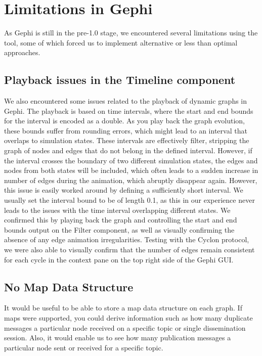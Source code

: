 \section{Limitations in Gephi}

As Gephi is still in the pre-1.0 stage, we encountered several
limitations using the tool, some of which forced us to implement
alternative or less than optimal approaches.

\subsection{Playback issues in the Timeline component}

We also encountered some issues related to the playback of dynamic
graphs in Gephi. The playback is based on time intervals, where the
start and end bounds for the interval is encoded as a double. As you
play back the graph evolution, these bounds suffer from rounding errors,
which might lead to an interval that overlaps to simulation states.
These intervals are effectively filter, stripping the graph of nodes and
edges that do not belong in the defined interval. However, if the
interval crosses the boundary of two different simulation states, the
edges and nodes from both states will be included, which often leads to
a sudden increase in number of edges during the animation, which
abruptly disappear again. However, this issue is easily worked around by
defining a sufficiently short interval. We usually set the interval
bound to be of length 0.1, as this in our experience never leads to the
issues with the time interval overlapping different states. We confirmed
this by playing back the graph and controlling the start and end bounds
output on the Filter component, as well as visually confirming the
absence of any edge animation irregularities. Testing with the Cyclon
protocol, we were also able to visually confirm that the number of edges
remain consistent for each cycle in the context pane on the top right
side of the Gephi GUI\@.

\subsection{No Map Data Structure}

It would be useful to be able to store a map data structure on each
graph. If maps were supported, you could derive information such as how
many duplicate messages a particular node received on a specific topic
or single dissemination session. Also, it would enable us to see how
many publication messages a particular node sent or received for a
specific topic.


